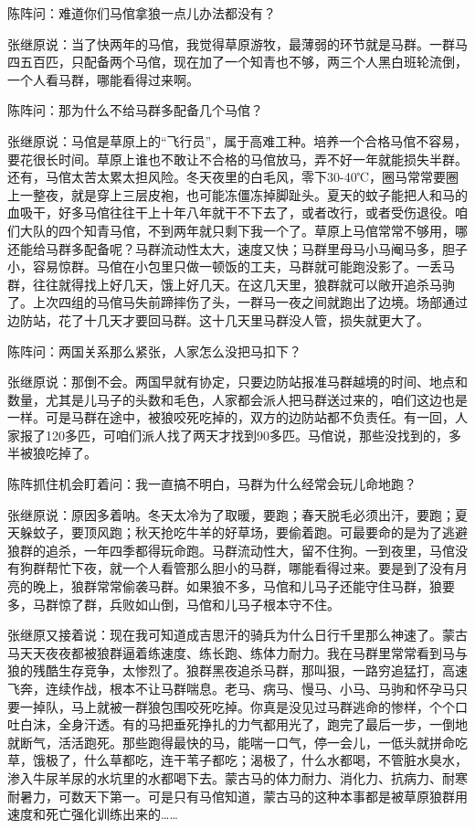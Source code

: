 \par 陈阵问：难道你们马倌拿狼一点儿办法都没有？
\par 张继原说：当了快两年的马倌，我觉得草原游牧，最薄弱的环节就是马群。一群马四五百匹，只配备两个马倌，现在加了一个知青也不够，两三个人黑白班轮流倒，一个人看马群，哪能看得过来啊。
\par 陈阵问：那为什么不给马群多配备几个马倌？
\par 张继原说：马倌是草原上的“飞行员”，属于高难工种。培养一个合格马倌不容易，要花很长时间。草原上谁也不敢让不合格的马倌放马，弄不好一年就能损失半群。还有，马倌太苦太累太担风险。冬天夜里的白毛风，零下30-40℃，圈马常常要圈上一整夜，就是穿上三层皮袍，也可能冻僵冻掉脚趾头。夏天的蚊子能把人和马的血吸干，好多马倌往往干上十年八年就干不下去了，或者改行，或者受伤退役。咱们大队的四个知青马倌，不到两年就只剩下我一个了。草原上马倌常常不够用，哪还能给马群多配备呢？马群流动性太大，速度又快；马群里母马小马阉马多，胆子小，容易惊群。马倌在小包里只做一顿饭的工夫，马群就可能跑没影了。一丢马群，往往就得找上好几天，饿上好几天。在这几天里，狼群就可以敞开追杀马驹了。上次四组的马倌马失前蹄摔伤了头，一群马一夜之间就跑出了边境。场部通过边防站，花了十几天才要回马群。这十几天里马群没人管，损失就更大了。
\par 陈阵问：两国关系那么紧张，人家怎么没把马扣下？
\par 张继原说：那倒不会。两国早就有协定，只要边防站报准马群越境的时间、地点和数量，尤其是儿马子的头数和毛色，人家都会派人把马群送过来的，咱们这边也是一样。可是马群在途中，被狼咬死吃掉的，双方的边防站都不负责任。有一回，人家报了120多匹，可咱们派人找了两天才找到90多匹。马倌说，那些没找到的，多半被狼吃掉了。
\par 陈阵抓住机会盯着问：我一直搞不明白，马群为什么经常会玩儿命地跑？
\par 张继原说：原因多着呐。冬天太冷为了取暖，要跑；春天脱毛必须出汗，要跑；夏天躲蚊子，要顶风跑；秋天抢吃牛羊的好草场，要偷着跑。可最要命的是为了逃避狼群的追杀，一年四季都得玩命跑。马群流动性大，留不住狗。一到夜里，马倌没有狗群帮忙下夜，就一个人看管那么胆小的马群，哪能看得过来。要是到了没有月亮的晚上，狼群常常偷袭马群。如果狼不多，马倌和儿马子还能守住马群，狼要多，马群惊了群，兵败如山倒，马倌和儿马子根本守不住。
\par 张继原又接着说：现在我可知道成吉思汗的骑兵为什么日行千里那么神速了。蒙古马天天夜夜都被狼群逼着练速度、练长跑、练体力耐力。我在马群里常常看到马与狼的残酷生存竞争，太惨烈了。狼群黑夜追杀马群，那叫狠，一路穷追猛打，高速飞奔，连续作战，根本不让马群喘息。老马、病马、慢马、小马、马驹和怀孕马只要一掉队，马上就被一群狼包围咬死吃掉。你真是没见过马群逃命的惨样，个个口吐白沫，全身汗透。有的马把垂死挣扎的力气都用光了，跑完了最后一步，一倒地就断气，活活跑死。那些跑得最快的马，能喘一口气，停一会儿，一低头就拼命吃草，饿极了，什么草都吃，连干苇子都吃；渴极了，什么水都喝，不管脏水臭水，渗入牛尿羊尿的水坑里的水都喝下去。蒙古马的体力耐力、消化力、抗病力、耐寒耐暑力，可数天下第一。可是只有马倌知道，蒙古马的这种本事都是被草原狼群用速度和死亡强化训练出来的……
